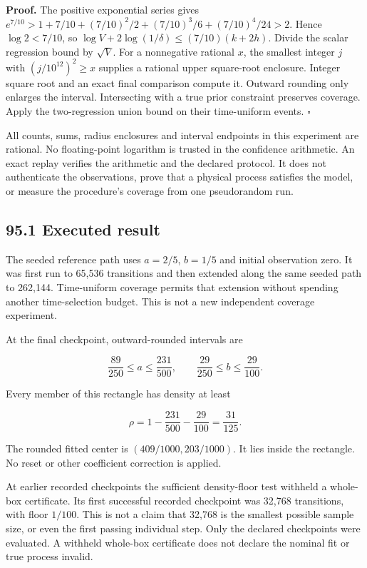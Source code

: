 \documentclass[11pt,letterpaper]{article}
\begin{document}
\textbf{Proof.} The positive exponential series gives
\(e^{7/10}>1+7/10+(7/10)^2/2+(7/10)^3/6+(7/10)^4/24>2\). Hence
\(\log 2<7/10\), so \(\log V+2\log(1/\delta)\leq(7/10)(k+2h)\). Divide
the scalar regression bound by \(\sqrt V\). For a nonnegative rational
\(x\), the smallest integer \(j\) with \((j/10^{12})^2\geq x\) supplies
a rational upper square-root enclosure. Integer square root and an exact
final comparison compute it. Outward rounding only enlarges the
interval. Intersecting with a true prior constraint preserves coverage.
Apply the two-regression union bound on their time-uniform events.
\(\square\)

All counts, sums, radius enclosures and interval endpoints in this
experiment are rational. No floating-point logarithm is trusted in the
confidence arithmetic. An exact replay verifies the arithmetic and the
declared protocol. It does not authenticate the observations, prove that
a physical process satisfies the model, or measure the procedure's
coverage from one pseudorandom run.

\subsection{95.1 Executed result}\label{executed-result}

The seeded reference path uses \(a=2/5\), \(b=1/5\) and initial
observation zero. It was first run to 65,536 transitions and then
extended along the same seeded path to 262,144. Time-uniform coverage
permits that extension without spending another time-selection budget.
This is not a new independent coverage experiment.

At the final checkpoint, outward-rounded intervals are

\[
\boxed{
\frac{89}{250}\leq a\leq\frac{231}{500},
\qquad
\frac{29}{250}\leq b\leq\frac{29}{100}.
}
\]

Every member of this rectangle has density at least

\[
\rho=1-\frac{231}{500}-\frac{29}{100}=\frac{31}{125}.
\]

The rounded fitted center is \((409/1000,203/1000)\). It lies inside the
rectangle. No reset or other coefficient correction is applied.

At earlier recorded checkpoints the sufficient density-floor test
withheld a whole-box certificate. Its first successful recorded
checkpoint was 32,768 transitions, with floor \(1/100\). This is not a
claim that 32,768 is the smallest possible sample size, or even the
first passing individual step. Only the declared checkpoints were
evaluated. A withheld whole-box certificate does not declare the nominal
fit or true process invalid.
\end{document}
